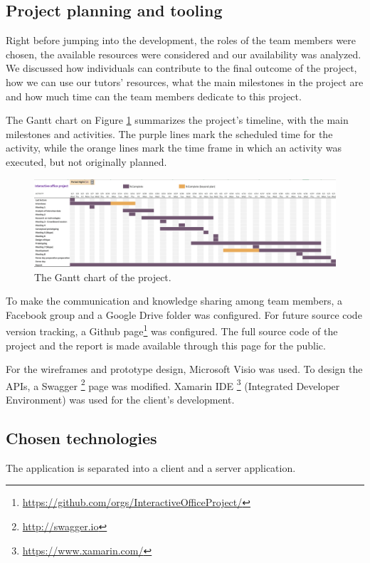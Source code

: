 \subsection{Project planning and tooling}
Right before jumping into the development, the roles of the team members were chosen, the available resources were considered and our availability was analyzed. We discussed how individuals can contribute to the final outcome of the project, how we can use our tutors' resources, what the main milestones in the project are and how much time can the team members dedicate to this project. 

The Gantt chart on Figure \ref{gantt-chart} summarizes the project's timeline, with the main milestones and activities. The purple lines mark the scheduled time for the activity, while the orange lines mark the time frame in which an activity was executed, but not originally planned.
 
\begin{figure}[h] 
		\begin{center}
			\includegraphics[width=1\textwidth]{images/gantt-chart.png}
			\caption{The Gantt chart of the project.}
			\label{gantt-chart}
		\end{center}
	\end{figure} 
 
To make the communication and knowledge sharing among team members, a Facebook group and a Google Drive folder was configured. For future source code version tracking, a Github page\footnote{\url{https://github.com/orgs/InteractiveOfficeProject/}} was configured. The full source code of the project and the report is made available through this page for the public. 

For the wireframes and prototype design, Microsoft Visio was used. To design the APIs, a Swagger \footnote{\url{http://swagger.io}} page was modified. Xamarin IDE \footnote{\url{https://www.xamarin.com/}} (Integrated Developer Environment) was used for the client's development.

\subsection{Chosen technologies}
The application is separated into a client and a server application.

